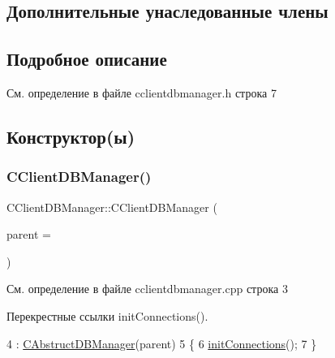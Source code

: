 \subsection*{Дополнительные унаследованные члены}


\subsection{Подробное описание}


См. определение в файле cclientdbmanager.\+h строка 7



\subsection{Конструктор(ы)}
\hypertarget{class_c_client_d_b_manager_aaac2c483f7a445d8565a6dd35f1a77b9}{}\label{class_c_client_d_b_manager_aaac2c483f7a445d8565a6dd35f1a77b9} 
\subsubsection{\texorpdfstring{C\+Client\+D\+B\+Manager()}{CClientDBManager()}}
{\footnotesize\ttfamily C\+Client\+D\+B\+Manager\+::\+C\+Client\+D\+B\+Manager (\begin{DoxyParamCaption}\item[{Q\+Object $\ast$}]{parent = {} }\end{DoxyParamCaption})\hspace{0.3cm}{\ttfamily [explicit]}}



См. определение в файле cclientdbmanager.\+cpp строка 3



Перекрестные ссылки init\+Connections().


\begin{DoxyCode}
4     : \hyperlink{class_c_abstruct_d_b_manager_a53c2018cfa7a1a24bacd747967509bd7}{CAbstructDBManager}(parent)
5 \{
6     \hyperlink{class_c_client_d_b_manager_a85d962d6f61d8f9480b6bc9a7f121204}{initConnections}();
7 \}
\end{DoxyCode}
\hypertarget{class_c_client_d_b_manager_a93ee522535ebb3bcba938b251ee9fa1b}{}\label{class_c_client_d_b_manager_a93ee522535ebb3bcba938b251ee9fa1b} 
